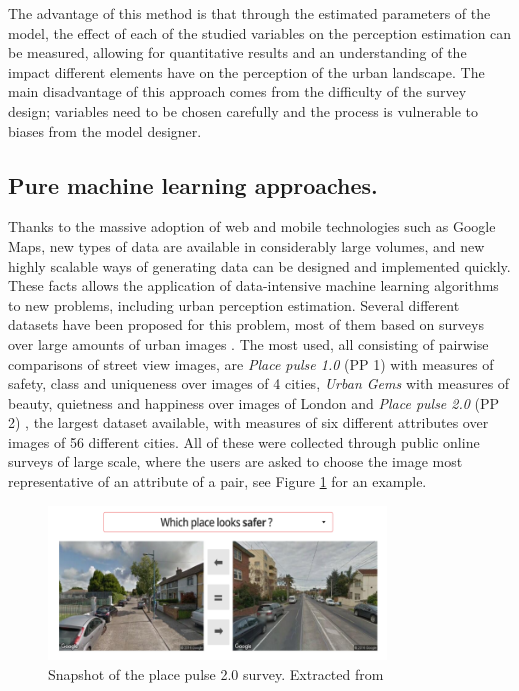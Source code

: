 The advantage of this method is that through the estimated parameters of the model, the effect
of each of the studied variables on the perception estimation can be measured, allowing for
quantitative results and an understanding of the impact different elements have on the
perception of the urban landscape. The main disadvantage of this approach comes from the
difficulty of the  survey design; variables need to be chosen carefully and the process is
vulnerable to biases from the model designer.

\subsection{Pure machine learning approaches.}

Thanks to the massive adoption of web and mobile technologies such as Google Maps, new types of
data are available in considerably large volumes, and new highly scalable ways of  generating data can be
designed and implemented quickly. These facts allows the application of data-intensive
machine learning algorithms to new  problems, including urban perception estimation. Several different
datasets have been proposed for this problem, most of them based on surveys over large amounts of urban images
\cite{hidalgo_inequality, hidalgo_placepulse, quercia_aesthetic, liu_machine, santani}. The most used,
all consisting of pairwise comparisons of street view images, are \textit{Place pulse 1.0} (PP 1) \cite{hidalgo_inequality}
with measures of safety, class and uniqueness over images of 4 cities, \textit{Urban Gems} with measures of
beauty, quietness and happiness over images of London and \textit{Place pulse 2.0} (PP 2) \cite{hidalgo_placepulse}, the largest dataset
available, with measures of six different attributes over images of 56 different cities. All of these were collected
through public online surveys of large scale, where the users
are asked to choose the image most representative of an attribute of a pair, see Figure \ref{fig:survey} for an example.

\begin{figure}[ht]
	\begin{center}
	\includegraphics[width=0.8\textwidth]{./figures/placepulse.png}
	\caption[Place pulse 2.0 survey]{Snapshot of the place pulse 2.0 survey. Extracted from  }
	\label{fig:survey}
	\end{center}
\end{figure}

